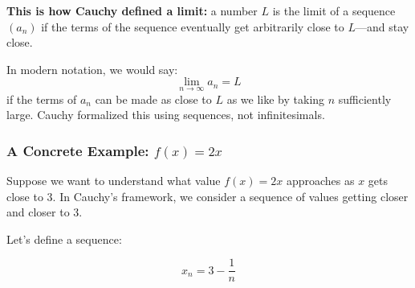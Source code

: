 \textbf{This is how Cauchy defined a limit:} a number \( L \) is the limit of a sequence \( (a_n) \) if the terms of the sequence eventually get arbitrarily close to \( L \)—and stay close.

In modern notation, we would say:  
\[
\lim_{n \to \infty} a_n = L
\]
if the terms of \( a_n \) can be made as close to \( L \) as we like by taking \( n \) sufficiently large. Cauchy formalized this using sequences, not infinitesimals.

\begin{center}
\end{center}


\subsubsection{A Concrete Example: \( f(x) = 2x \)}

Suppose we want to understand what value \( f(x) = 2x \) approaches as \( x \) gets close to 3. In Cauchy’s framework, we consider a sequence of values getting closer and closer to 3.

Let’s define a sequence:

\[
x_n = 3 - \frac{1}{n}
\]

